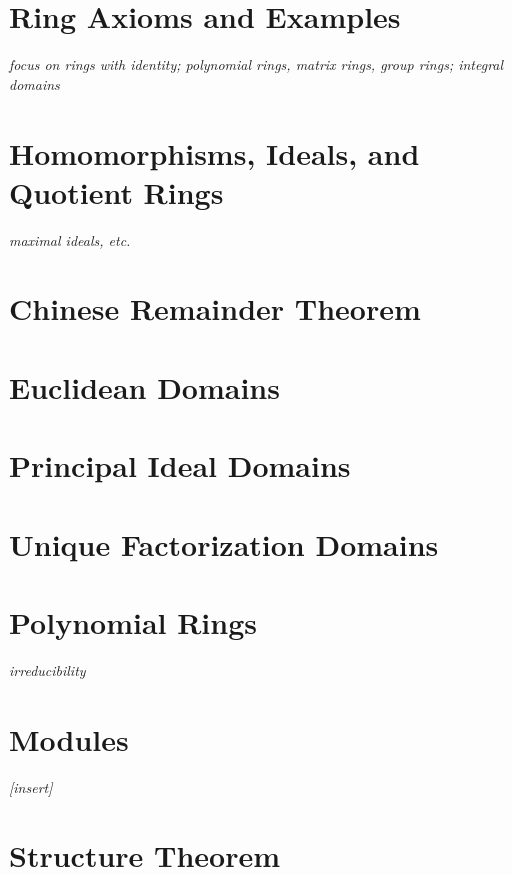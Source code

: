 \documentclass[../../../main.tex]{subfiles}
\begin{document}

\section{Ring Axioms and Examples}
\textit{focus on rings with identity; polynomial rings, matrix rings, group rings; integral domains}
\section{Homomorphisms, Ideals, and Quotient Rings}
\textit{maximal ideals, etc.}
\section{Chinese Remainder Theorem}
\section{Euclidean Domains}
\section{Principal Ideal Domains}
\section{Unique Factorization Domains}
\section{Polynomial Rings}
\textit{irreducibility}
\section{Modules}
\textit{[insert]}
\section{Structure Theorem}

\printbibliography[
    heading=subbibintoc,
    title={References}
]
\end{document}
